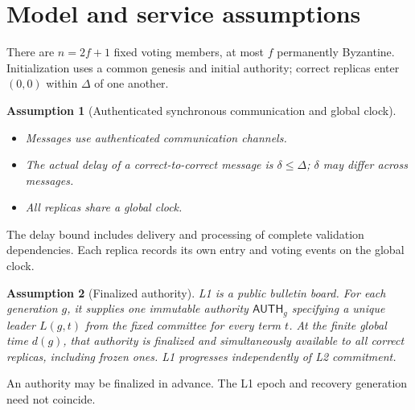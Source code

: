 \documentclass[11pt,a4paper]{article}
\newcommand{\tagg}[1]{\ensuremath{\mathsf{#1}}}
\newtheorem{assumption}[assumption]{Assumption}
\begin{document}
\section{Model and service assumptions}
\label{sec:model}
There are $n=2f+1$ fixed voting members, at most $f$ permanently Byzantine.
Initialization uses a common genesis and initial authority; correct
replicas enter $(0,0)$ within $\Delta$ of one another.

\begin{assumption}[Authenticated synchronous communication and global clock]
\label{ass:network}
\leavevmode\par
\begin{itemize}
    \item Messages use authenticated communication channels.
    \item The actual delay of a correct-to-correct message is $\delta\le\Delta$;
    $\delta$ may differ across messages.
    \item All replicas share a global clock.
\end{itemize}
\end{assumption}
The delay bound includes delivery and processing of complete validation
dependencies. Each replica records its own entry and voting events on
the global clock.

\begin{assumption}[Finalized authority]
\label{ass:authority}
L1 is a public bulletin board. For each generation $g$, it supplies one
immutable authority $\tagg{AUTH}_g$ specifying a unique leader $L(g,t)$
from the fixed committee for every term $t$. At the finite global time
$d(g)$, that authority is finalized and simultaneously available to all
correct replicas, including frozen ones. L1 progresses independently
of L2 commitment.
\end{assumption}
An authority may be finalized in advance. The L1 epoch and recovery
generation need not coincide.
\end{document}
